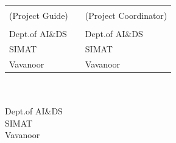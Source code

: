 	
	\begin{singlespace}
		\vspace*{2cm}
		\begin{table}[h!]
			\centering
			\begin{tabular}{p{7cm} p{0.9cm} p{7cm}} 
				\textbf{\guide} && \textbf{\projcordinatorA} \\
				(Project Guide) &&  (Project Coordinator)\\
				\guidedes & & \projcordinatorAdes\\ 
				Dept.of AI\&DS && Dept.of AI\&DS\\ 
				SIMAT & & SIMAT\\
				Vavanoor && Vavanoor\\
			\end{tabular}
			
		\end{table}
		
		\vspace*{1.3cm}
		
		\begin{center}
			
			\textbf{\hod} \\ 
			\hoddes\\ 
			Dept.of AI\&DS\\ 
			SIMAT\\
			Vavanoor\\
			
		\end{center}
	\end{singlespace}
	
	\thispagestyle{empty}



